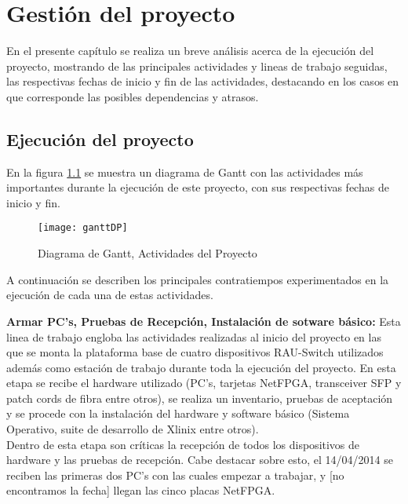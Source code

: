 \chapter{Gestión del proyecto}

\ifpdf
    \graphicspath{{Chapter7/Figs/Raster/}{Chapter7/Figs/PDF/}{Chapter7/Figs/}}
\else
    \graphicspath{{Chapter7/Figs/Vector/}{Chapter7/Figs/}}
\fi

En el presente cap\'itulo se realiza un breve análisis acerca de la ejecuci\'on del proyecto, mostrando de las principales actividades y lineas de trabajo seguidas, las respectivas fechas de inicio y fin de las actividades, destacando en los casos en que corresponde las posibles dependencias y atrasos.

\section{Ejecuci\'on del proyecto}

En la figura \ref{fig:gantt} se muestra un diagrama de Gantt con las actividades m\'as importantes durante la ejecuci\'on de este proyecto, con sus respectivas fechas de inicio y fin.

\begin{figure}[h!] 
\centering    
\texttt{[image: ganttDP]}
\caption[Diagrama de Gantt, Actividades del Proyecto]{Diagrama de Gantt, Actividades del Proyecto}
\label{fig:gantt}
\end{figure}

A continuaci\'on se describen los principales contratiempos experimentados en la ejecuci\'on de cada una de estas actividades.

\textbf{Armar PC's, Pruebas de Recepción, Instalación de sotware b\'asico:} Esta linea de trabajo engloba las actividades realizadas al inicio del proyecto en las que se monta la plataforma base de cuatro dispositivos RAU-Switch utilizados adem\'as como estaci\'on de trabajo durante toda la ejecuci\'on del proyecto. En esta etapa se recibe el hardware utilizado (PC's, tarjetas NetFPGA, transceiver SFP y patch cords de fibra entre otros), se realiza un inventario, pruebas de aceptaci\'on y se procede con la instalaci\'on del hardware y software b\'asico (Sistema Operativo, suite de desarrollo de Xlinix entre otros).\\

Dentro de esta etapa son cr\'iticas la recepci\'on de todos los dispositivos de hardware y las pruebas de recepci\'on. Cabe destacar sobre esto, el 14/04/2014 se reciben las primeras dos PC's con las cuales empezar a trabajar, y [no encontramos la fecha] llegan las cinco placas NetFPGA.\\

